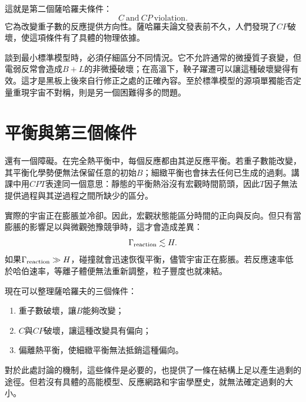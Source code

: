 這就是第二個薩哈羅夫條件：
\begin{equation}
\boxed{C\ \text{and}\ CP\ \text{violation}.}
\end{equation}
它為改變重子數的反應提供方向性。薩哈羅夫論文發表前不久，人們發現了\(CP\)破壞，使這項條件有了具體的物理依據。

談到最小標準模型時，必須仔細區分不同情況。它不允許通常的微擾質子衰變，但電弱反常會造成\(B+L\)的非微擾破壞；在高溫下，鞅子躍遷可以讓這種破壞變得有效。這才是黑板上後來自行修正之處的正確內容。至於標準模型的源項單獨能否定量重現宇宙不對稱，則是另一個困難得多的問題。

\section{平衡與第三個條件}

還有一個障礙。在完全熱平衡中，每個反應都由其逆反應平衡。若重子數能改變，其平衡化學勢便無法保留任意的初始\(B\)；細緻平衡也會抹去任何已生成的過剩。講課中用\(CPT\)表達同一個意思：靜態的平衡熱浴沒有宏觀時間箭頭，因此\(T\)因子無法提供過程與其逆過程之間所缺少的區分。

實際的宇宙正在膨脹並冷卻。因此，宏觀狀態能區分時間的正向與反向。但只有當膨脹的影響足以與微觀弛豫競爭時，這才會造成差異：
\begin{equation}
\Gamma_{\rm reaction}\lesssim H.
\label{eq:c08-freezeout-condition}
\end{equation}
如果\(\Gamma_{\rm reaction}\gg H\)，碰撞就會迅速恢復平衡，儘管宇宙正在膨脹。若反應速率低於哈伯速率，等離子體便無法重新調整，粒子豐度也就凍結。

\begin{classroomqa}
\end{classroomqa}

現在可以整理薩哈羅夫的三個條件：
\begin{enumerate}
\item 重子數破壞，讓\(B\)能夠改變；
\item \(C\)與\(CP\)破壞，讓這種改變具有偏向；
\item 偏離熱平衡，使細緻平衡無法抵銷這種偏向。
\end{enumerate}
對於此處討論的機制，這些條件是必要的，也提供了一條在結構上足以產生過剩的途徑。但若沒有具體的高能模型、反應網路和宇宙學歷史，就無法確定過剩的大小。

